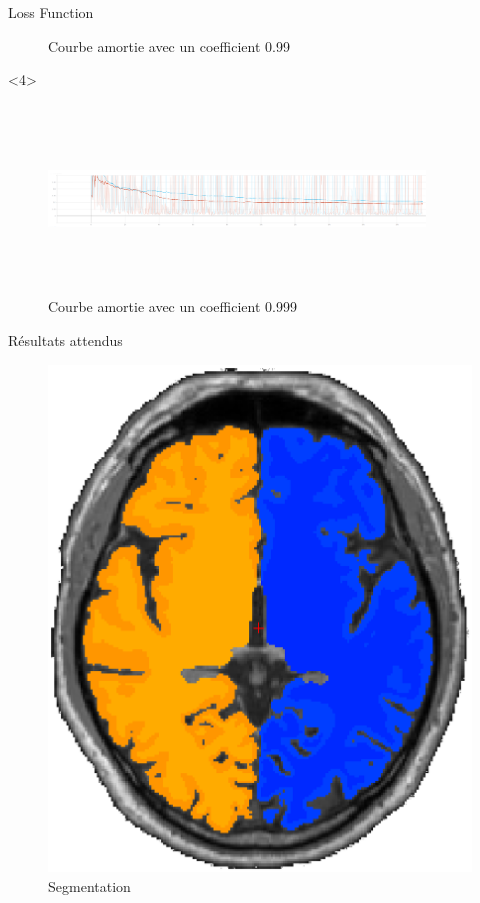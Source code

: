 \documentclass{beamer}
\begin{document}
\begin{frame}[t]{Loss Function}
\begin{onlyenv}
\begin{figure}
      \caption{Courbe amortie avec un coefficient 0.99}
      \label{courbe99}
    \end{figure}
  \end{onlyenv}
  \begin{onlyenv}<4>
    \begin{figure}
      \includegraphics[width=10cm, height=5cm]{annex/loss_smoothed_0999}
      \caption{Courbe amortie avec un coefficient 0.999}
      \label{courbe999}
    \end{figure}
  \end{onlyenv}
\end{frame}

\begin{frame}[t]{Résultats attendus}
  \begin{figure}
    \includegraphics[scale=0.3]{annex/segmentation}
    \caption{Segmentation}
    \label{seg}
  \end{figure}
\end{frame}
\end{document}
